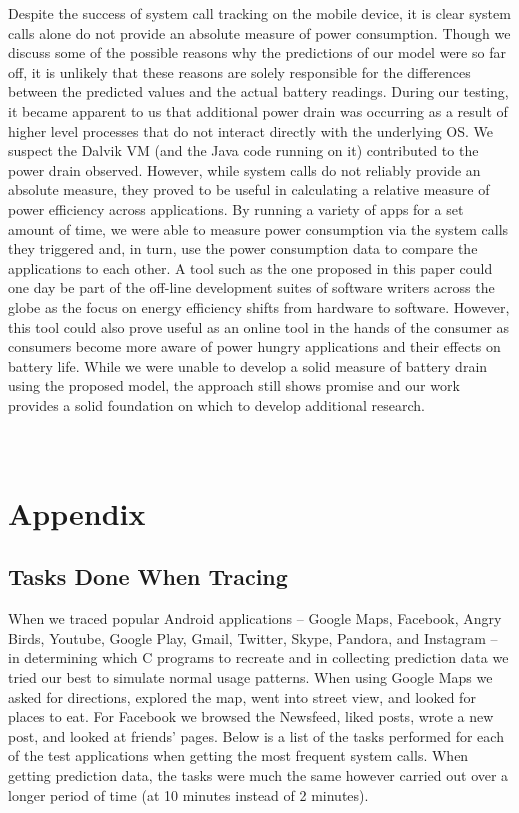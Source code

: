 \documentclass[11pt]{article}
\begin{document}
Despite the success of system call tracking on the mobile device, it is clear system calls alone do not provide an absolute measure of power consumption.  Though
we discuss some of the possible reasons why the predictions of our model were so far off, it is unlikely that these reasons are solely responsible for the
differences between the predicted values and the actual battery readings.  During our testing, it became apparent to us that additional power drain was
occurring as a result of higher level processes that do not interact directly with the underlying OS.  We suspect the Dalvik VM (and the Java code running on it) contributed to the power drain observed.  However, while system calls do not reliably provide an absolute measure, they proved to be useful in
calculating a relative measure of power efficiency across applications.  By running a variety of apps for a set amount of time, we were able to measure
power consumption via the system calls they triggered and, in turn, use the power consumption data to compare the applications to each other.  A tool such as
the one proposed in this paper could one day be part of the off-line development suites of software writers across the globe as the focus on energy efficiency shifts
from hardware to software.  However, this tool could also prove useful as an online tool in the hands of the consumer as consumers become more aware of power hungry applications and their effects on battery life.  While we were unable to develop a solid measure of battery drain using the proposed model, the approach still shows promise and our work provides a solid foundation on which to develop additional research.




\newpage
\appendix
\section{\\Appendix} \label{App:AppendixA}

\subsection{Tasks Done When Tracing}

When we traced popular Android applications -- Google Maps, 
Facebook, Angry Birds, Youtube, Google Play, Gmail, Twitter, Skype, Pandora, and Instagram --
in determining which C programs to recreate and in collecting prediction data we tried our
best to simulate normal usage patterns.  When using Google Maps we asked for directions, explored
the map, went into street view, and looked for places to eat. For Facebook we browsed the Newsfeed, 
liked posts, wrote a new post, and looked at friends' pages.  Below is a list of the tasks performed 
for each of the test applications when getting the most frequent system calls. When getting prediction
data, the tasks were much the same however carried out over a longer period of time (at 10 minutes instead
of 2 minutes).
\end{document}
